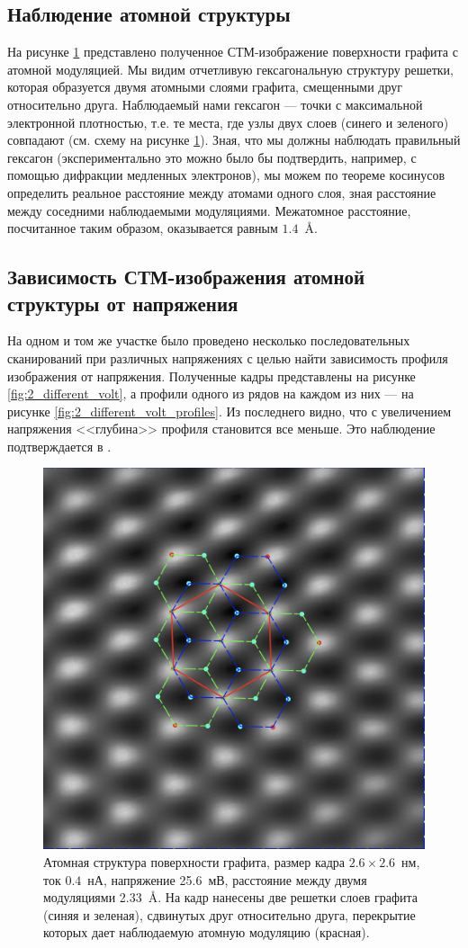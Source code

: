 \documentclass[a4paper, 12pt]{article}
\begin{document}
	\subsection{Наблюдение атомной структуры}
	
	На рисунке \ref{fig:2_atomic} представлено полученное СТМ-изображение поверхности графита с атомной модуляцией. Мы видим отчетливую гексагональную структуру решетки, которая образуется двумя атомными слоями графита, смещенными друг относительно друга. Наблюдаемый нами гексагон --- точки с максимальной электронной плотностью, т.е. те места, где узлы двух слоев (синего и зеленого) совпадают (см. схему на рисунке \ref{fig:2_atomic}). Зная, что мы должны наблюдать правильный гексагон (экспериментально это можно было бы подтвердить, например, с помощью дифракции медленных электронов), мы можем по теореме косинусов определить реальное расстояние между атомами одного слоя, зная расстояние между соседними наблюдаемыми модуляциями. Межатомное расстояние, посчитанное таким образом, оказывается равным $1.4$~\AA. 
	
	\subsection{Зависимость СТМ-изображения атомной структуры от напряжения}
	
	На одном и том же участке было проведено несколько последовательных сканирований при различных напряжениях с целью найти зависимость профиля изображения от напряжения. Полученные кадры представлены на рисунке \ref{fig:2_different_volt}, а профили одного из рядов на каждом из них --- на рисунке \ref{fig:2_different_volt_profiles}. Из последнего видно, что с увеличением напряжения <<глубина>> профиля становится все меньше. Это наблюдение подтверждается в \cite{STM_Binnig}.
	
	\begin{figure}[H]
		\centering
		\includegraphics[width=0.6\linewidth]{Crystal_structure}
		\caption{Атомная структура поверхности графита, размер кадра $2.6\times2.6$~нм, ток $0.4$~нА, напряжение 25.6~мВ, расстояние между двумя модуляциями 2.33~\AA. На кадр нанесены две решетки слоев графита (синяя и зеленая), сдвинутых друг относительно друга, перекрытие которых дает наблюдаемую атомную модуляцию (красная).}
		\label{fig:2_atomic}
	\end{figure}
	
\end{document}

